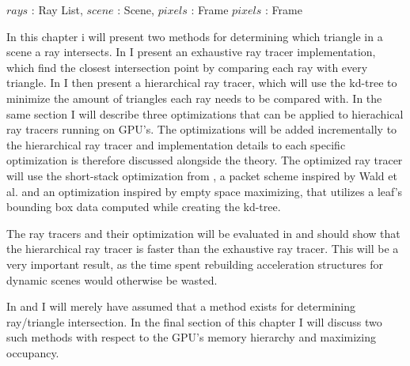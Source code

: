 \begin{algorithm}
  \caption{A generel ray tracer.}
  \label{alg:generelRayTracer}
  \begin{algorithmic}
              {$rays$ : Ray List, $scene$ : Scene, $pixels$ : Frame}
              {$pixels$ : Frame}{
                  \ENDIF
                \ENDFOR
                \ENDIF
              }
  \end{algorithmic}
\end{algorithm}

In this chapter i will present two methods for determining which triangle in a
scene a ray intersects. In  I present an exhaustive
ray tracer implementation, which find the closest intersection point by
comparing each ray with every triangle. In
 I then present a hierarchical ray tracer,
which will use the kd-tree to minimize the amount of triangles each ray needs to
be compared with. In the same section I will describe three optimizations that
can be applied to hierachical ray tracers running on GPU's. The optimizations
will be added incrementally to the hierarchical ray tracer and implementation
details to each specific optimization is therefore discussed alongside the
theory. The optimized ray tracer will use the short-stack optimization from
\horn, a packet scheme inspired by Wald et al. and an
optimization inspired by empty space maximizing, that utilizes a leaf's bounding
box data computed while creating the kd-tree.

The ray tracers and their optimization will be evaluated in
 and should show that the hierarchical ray tracer is
faster than the exhaustive ray tracer. This will be a very important result, as
the time spent rebuilding acceleration structures for dynamic scenes would
otherwise be wasted.

In  and  I will
merely have assumed that a method exists for determining ray/triangle
intersection. In the final section of this chapter I will discuss two such
methods with respect to the GPU's memory hierarchy and maximizing
occupancy.



